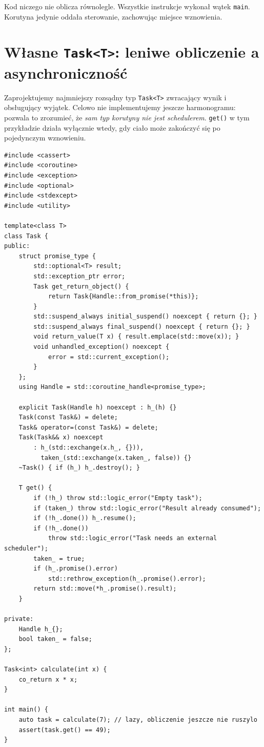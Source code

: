 Kod niczego nie oblicza równolegle. Wszystkie instrukcje wykonał
wątek \texttt{main}. Korutyna jedynie oddała sterowanie, zachowując
miejsce wznowienia.

\section{Własne \texttt{Task<T>}: leniwe obliczenie a asynchroniczność}
\label{sec:cpp15-task}

Zaprojektujemy najmniejszy rozsądny typ \texttt{Task<T>} zwracający
wynik i obsługujący wyjątek. Celowo nie implementujemy jeszcze
harmonogramu: pozwala to zrozumieć, że \emph{sam typ korutyny nie jest
schedulerem}. \texttt{get()} w tym przykładzie działa wyłącznie
wtedy, gdy ciało może zakończyć się po pojedynczym wznowieniu.

\begin{lstlisting}[caption={Lazy Task<T> bez schedulera (C++20); kompletny program.}]
#include <cassert>
#include <coroutine>
#include <exception>
#include <optional>
#include <stdexcept>
#include <utility>

template<class T>
class Task {
public:
    struct promise_type {
        std::optional<T> result;
        std::exception_ptr error;
        Task get_return_object() {
            return Task{Handle::from_promise(*this)};
        }
        std::suspend_always initial_suspend() noexcept { return {}; }
        std::suspend_always final_suspend() noexcept { return {}; }
        void return_value(T x) { result.emplace(std::move(x)); }
        void unhandled_exception() noexcept {
            error = std::current_exception();
        }
    };
    using Handle = std::coroutine_handle<promise_type>;

    explicit Task(Handle h) noexcept : h_(h) {}
    Task(const Task&) = delete;
    Task& operator=(const Task&) = delete;
    Task(Task&& x) noexcept
        : h_(std::exchange(x.h_, {})),
          taken_(std::exchange(x.taken_, false)) {}
    ~Task() { if (h_) h_.destroy(); }

    T get() {
        if (!h_) throw std::logic_error("Empty task");
        if (taken_) throw std::logic_error("Result already consumed");
        if (!h_.done()) h_.resume();
        if (!h_.done())
            throw std::logic_error("Task needs an external scheduler");
        taken_ = true;
        if (h_.promise().error)
            std::rethrow_exception(h_.promise().error);
        return std::move(*h_.promise().result);
    }

private:
    Handle h_{};
    bool taken_ = false;
};

Task<int> calculate(int x) {
    co_return x * x;
}

int main() {
    auto task = calculate(7); // lazy, obliczenie jeszcze nie ruszylo
    assert(task.get() == 49);
}
\end{lstlisting}

